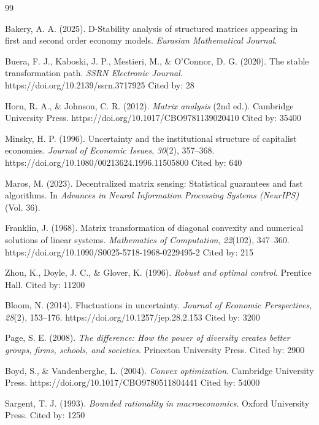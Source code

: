 \documentclass[a4paper,12pt]{article}
\theoremstyle{definition}
\begin{document}
\begin{thebibliography}{99}

Bakery, A. A. (2025). D-Stability analysis of structured matrices appearing in first and second order economy models. \textit{Eurasian Mathematical Journal}.

Buera, F. J., Kaboski, J. P., Mestieri, M., \& O’Connor, D. G. (2020). The stable transformation path. \textit{SSRN Electronic Journal}. https://doi.org/10.2139/ssrn.3717925
Cited by: 28

Horn, R. A., \& Johnson, C. R. (2012). \textit{Matrix analysis} (2nd ed.). Cambridge University Press. https://doi.org/10.1017/CBO9781139020410
Cited by: 35400

Minsky, H. P. (1996). Uncertainty and the institutional structure of capitalist economies. \textit{Journal of Economic Issues}, \textit{30}(2), 357–368. https://doi.org/10.1080/00213624.1996.11505800
Cited by: 640

Maros, M. (2023). Decentralized matrix sensing: Statistical guarantees and fast algorithms. In \textit{Advances in Neural Information Processing Systems (NeurIPS)} (Vol. 36).

Franklin, J. (1968). Matrix transformation of diagonal convexity and numerical solutions of linear systems. \textit{Mathematics of Computation}, \textit{22}(102), 347–360. https://doi.org/10.1090/S0025-5718-1968-0229495-2
Cited by: 215

Zhou, K., Doyle, J. C., \& Glover, K. (1996). \textit{Robust and optimal control}. Prentice Hall.
Cited by: 11200

Bloom, N. (2014). Fluctuations in uncertainty. \textit{Journal of Economic Perspectives}, \textit{28}(2), 153–176. https://doi.org/10.1257/jep.28.2.153
Cited by: 3200

Page, S. E. (2008). \textit{The difference: How the power of diversity creates better groups, firms, schools, and societies}. Princeton University Press.
Cited by: 2900

Boyd, S., \& Vandenberghe, L. (2004). \textit{Convex optimization}. Cambridge University Press. https://doi.org/10.1017/CBO9780511804441
Cited by: 54000

Sargent, T. J. (1993). \textit{Bounded rationality in macroeconomics}. Oxford University Press.
Cited by: 1250

\end{thebibliography}
\end{document}
